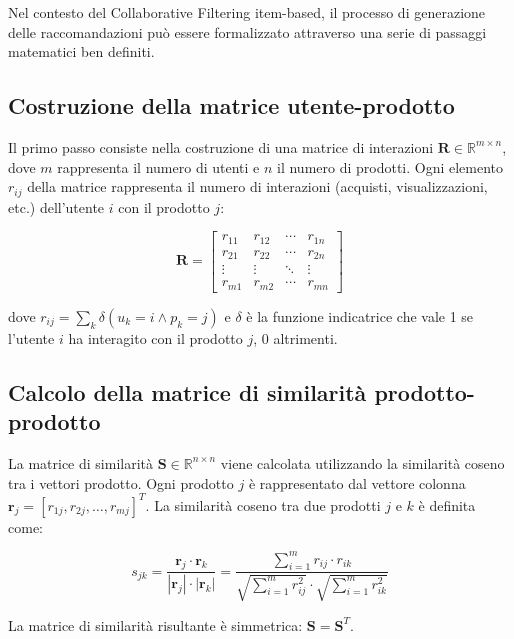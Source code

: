 Nel contesto del Collaborative Filtering item-based, il processo di generazione delle raccomandazioni può essere formalizzato attraverso una serie di passaggi matematici ben definiti.

\subsection{Costruzione della matrice utente-prodotto}

Il primo passo consiste nella costruzione di una matrice di interazioni $\mathbf{R} \in \mathbb{R}^{m \times n}$, dove $m$ rappresenta il numero di utenti e $n$ il numero di prodotti. Ogni elemento $r_{ij}$ della matrice rappresenta il numero di interazioni (acquisti, visualizzazioni, etc.) dell'utente $i$ con il prodotto $j$:

\begin{equation}
\mathbf{R} = \begin{bmatrix}
r_{11} & r_{12} & \cdots & r_{1n} \\
r_{21} & r_{22} & \cdots & r_{2n} \\
\vdots & \vdots & \ddots & \vdots \\
r_{m1} & r_{m2} & \cdots & r_{mn}
\end{bmatrix}
\end{equation}

dove $r_{ij} = \sum_{k} \delta(u_k = i \land p_k = j)$ e $\delta$ è la funzione indicatrice che vale 1 se l'utente $i$ ha interagito con il prodotto $j$, 0 altrimenti.

\subsection{Calcolo della matrice di similarità prodotto-prodotto}

La matrice di similarità $\mathbf{S} \in \mathbb{R}^{n \times n}$ viene calcolata utilizzando la similarità coseno tra i vettori prodotto. Ogni prodotto $j$ è rappresentato dal vettore colonna $\mathbf{r}_j = [r_{1j}, r_{2j}, \ldots, r_{mj}]^T$. La similarità coseno tra due prodotti $j$ e $k$ è definita come:

\begin{equation}
s_{jk} = \frac{\mathbf{r}_j \cdot \mathbf{r}_k}{|\mathbf{r}_j| \cdot |\mathbf{r}_k|} = \frac{\sum_{i=1}^{m} r_{ij} \cdot r_{ik}}{\sqrt{\sum_{i=1}^{m} r_{ij}^2} \cdot \sqrt{\sum_{i=1}^{m} r_{ik}^2}}
\end{equation}

La matrice di similarità risultante è simmetrica: $\mathbf{S} = \mathbf{S}^T$.

